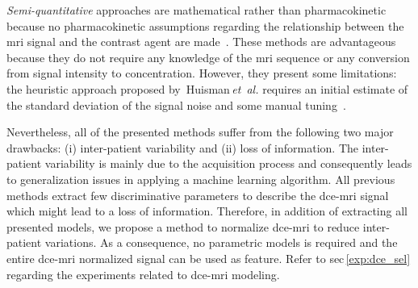 \documentclass[final,3p,times,twocolumn]{elsarticle}
\begin{document}
\emph{Semi-quantitative} approaches are mathematical rather than
pharmacokinetic because no pharmacokinetic assumptions regarding the
relationship between the \ac{mri} signal and the contrast agent are
made~\cite{huisman2001accurate,gliozzi2011phenomenological}. These methods are
advantageous because they do not require any knowledge of the \ac{mri} sequence
or any conversion from signal intensity to concentration. However, they present
some limitations: the heuristic approach proposed
by~Huisman\,\emph{et~al.} requires an initial estimate of the
standard deviation of the signal noise and some manual
tuning~\cite{huisman2001accurate}.

Nevertheless, all of the presented methods suffer from the following two major
drawbacks: (i) inter-patient variability and (ii) loss of information. The
inter-patient variability is mainly due to the acquisition process and
consequently leads to generalization issues in applying a machine learning
algorithm. All previous methods extract few discriminative parameters to
describe the \ac{dce}-\ac{mri} signal which might lead to a loss of
information. Therefore, in addition of extracting all presented models, we
propose a method to normalize \ac{dce}-\ac{mri} to reduce inter-patient
variations. As a consequence, no parametric models is required and the entire
\ac{dce}-\ac{mri} normalized signal can be used as feature. Refer to
\acs{sec}\,\ref{exp:dce_sel} regarding the experiments related to
\ac{dce}-\ac{mri} modeling.
\end{document}
